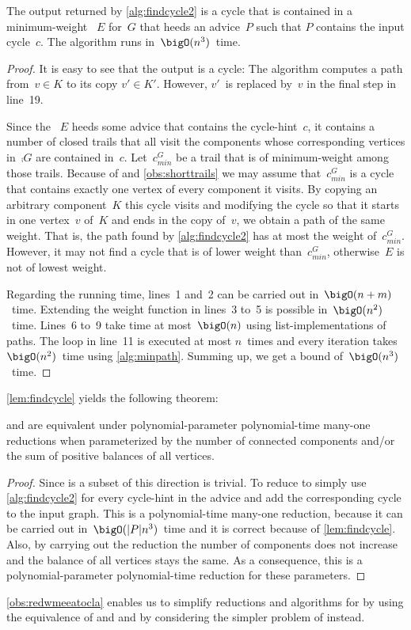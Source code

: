 \begin{lemma}\label{lem:findcycle}
  The output returned by \autoref{alg:findcycle2} is a cycle that is contained in a minimum-weight \EE{}~$E$ for~$G$ that heeds an advice~$P$ such that $P$ contains the input cycle~$c$. The algorithm runs in~$\bigO(n^3)$~time.
\end{lemma}
\begin{proof}
  It is easy to see that the output is a cycle: The algorithm computes a path from~$v \in K$ to its copy $v' \in K'$. However, $v'$~is replaced by~$v$ in the final step in line~19.

  Since the \EE{}~$E$ heeds some advice that contains the cycle-hint~$c$, it contains a number of closed trails that all visit the components whose corresponding vertices in~$\comp{G}$ are contained in~$c$. Let~$c^G_{min}$ be a trail that is of minimum-weight among those trails. Because of \SPP{} and \autoref{obs:shorttrails} we may assume that~$c^G_{min}$ is a cycle that contains exactly one vertex of every component it visits. By copying an arbitrary component~$K$ this cycle visits and modifying the cycle so that it starts in one vertex~$v$ of~$K$ and ends in the copy of~$v$, we obtain a path of the same weight. That is, the path found by \autoref{alg:findcycle2} has at most the weight of~$c^G_{min}$. However, it may not find a cycle that is of lower weight than~$c^G_{min}$, otherwise~$E$ is not of lowest weight.
  
  Regarding the running time, lines~1 and~2 can be carried out in~$\bigO(n + m)$~time. Extending the weight function in lines~3 to~5 is possible in~$\bigO(n^2)$~time. Lines~6 to~9 take time at most~$\bigO(n)$ using list-implementations of paths. The loop in line~11 is executed at most $n$~times and every iteration takes~$\bigO(n^2)$~time using \autoref{alg:minpath}. Summing up, we get a bound of~$\bigO(n^3)$~time.
\end{proof}
\autoref{lem:findcycle} yields the following theorem:
\begin{theorem} 
  \label{obs:redwmeeatocla}
  \pWMEEA{} and \pWMEECLA{} are equivalent under polynomial-parameter polynomial-time many-one reductions when parameterized by the number of connected components and/or the sum of positive balances of all vertices.
\end{theorem}
\begin{proof}
  Since \pWMEECLAs{} is a subset of \pWMEEAs{} this direction is trivial. To reduce \pWMEEAs{} to \pWMEECLAs{} simply use \autoref{alg:findcycle2} for every cycle-hint in the advice and add the corresponding cycle to the input graph. This is a polynomial-time many-one reduction, because it can be carried out in~$\bigO(|P|n^3)$~time and it is correct because of \autoref{lem:findcycle}. Also, by carrying out the reduction the number of components does not increase and the balance of all vertices stays the same. As a consequence, this is a polynomial-parameter polynomial-time reduction for these parameters.
\end{proof}
\autoref{obs:redwmeeatocla} enables us to simplify reductions and algorithms for \pWMEEAs{} by using the equivalence of \pWMEEAs{} and \pWMEECLAs{} and by considering the simpler problem of \pWMEECLAs{} instead.

